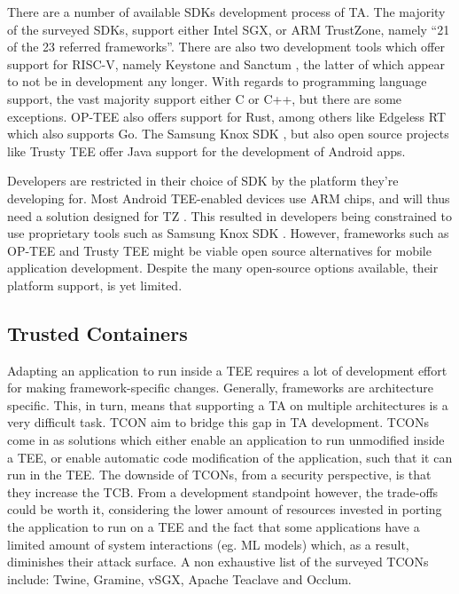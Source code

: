 \documentclass[runningheads,a4paper]{uwsese}
\begin{document}
There are a number of available \glspl{SDK} development process of \gls{TA}. The majority of the surveyed \glspl{SDK},
support either Intel SGX, or ARM TrustZone, namely ``21 of the 23 referred
frameworks''\cite{tee_app_rev}. There are also two development tools which
offer support for RISC-V, namely Keystone \cite{tee_keystone} and Sanctum
\cite{tee_sanctum}, the latter of which appear to not be in development any
longer. With regards to programming language support, the vast majority support
either C or C++, but there are some exceptions. OP-TEE \cite{optee} also offers
support for Rust, among others like Edgeless RT \cite{edgelessrt} which also
supports Go. The Samsung Knox \gls{SDK} \cite{knox_sdk}, but also open source
projects like Trusty TEE \cite{trustytee} offer Java support for the
development of Android apps.

Developers are restricted in their choice of \gls{SDK} by the platform they're
developing for. Most Android TEE-enabled devices use ARM chips, and will thus
need a solution designed for \gls{TZ} \cite{arm_tz}. This resulted in
developers being constrained to use proprietary tools such as Samsung Knox \gls{SDK}
\cite{knox_sdk}. However, frameworks such as OP-TEE \cite{optee} and Trusty TEE
\cite{trustytee} might be viable open source alternatives for mobile
application development. Despite the many open-source options available, their
platform support, is yet limited.

\subsection{Trusted Containers}

Adapting an application to run inside a \gls{TEE} requires a lot of development
effort for making framework-specific changes. Generally, frameworks are
architecture specific. This, in turn, means that supporting a \gls{TA} on
multiple architectures is a very difficult task. \gls{TCON} aim to bridge this
gap in \gls{TA} development. \glspl{TCON} come in as solutions which either
enable an application to run unmodified inside a \gls{TEE}, or enable automatic
code modification of the application, such that it can run in the \gls{TEE}.
The downside of \glspl{TCON}, from a security perspective, is that they
increase the \gls{TCB}. From a development standpoint however, the trade-offs
could be worth it, considering the lower amount of resources invested in
porting the application to run on a \gls{TEE} and the fact that some
applications have a limited amount of system interactions (eg. \gls{ML} models)
which, as a result, diminishes their attack surface. A non exhaustive list of
the surveyed \glspl{TCON} include: Twine, Gramine, vSGX, Apache Teaclave and
Occlum. 
\end{document}
